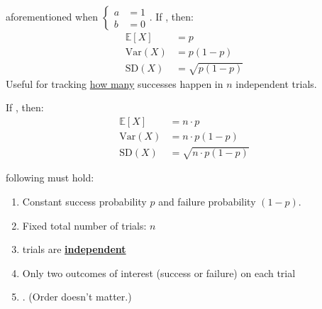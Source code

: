 \documentclass[10pt,landscape]{article}
\newcommand{\Red}[1]{\noindent{\textbf{\textcolor{BrickRed}{#1 -}}}}
\newcommand{\Hint}[1]{\noindent{\textcolor{Orange}{#1}}}
\begin{document}
\begin{multicols}{4}
\Red{Bernoulli Random Variable} aforementioned when $\begin{cases}
    a &= 1 \\
    b &= 0
\end{cases}$.
If , then:
\begin{displaymath}
    \boxed{
        \begin{aligned}
            \mathbb{E}\left[X\right] &= p \\
            \text{Var}(X) &= p(1-p) \\
            \text{SD}(X) &= \sqrt{p (1-p)}
        \end{aligned}
    }
\end{displaymath}
\Hint{
    \begin{itemize}
        \item Variance maximized when $p = 0.5$
        \item Variance minimized when $p = 0$ or $1$
    \end{itemize}
}
Useful for tracking \underline{how many} successes happen in $n$ independent trials.

\Red{Binomial Random Variable}
If , then:
\begin{displaymath}
    \boxed{
        \begin{aligned}
            \mathbb{E}\left[X\right] &= n \cdot p \\
            \text{Var}(X) &= n \cdot p(1-p) \\
            \text{SD}(X) &= \sqrt{n \cdot p(1-p)}
        \end{aligned}
    }
\end{displaymath}

\Red{Binomial Problems} following must hold:
\begin{enumerate}
    \item Constant success probability $p$ and failure probability $(1-p)$.
    \item Fixed total number of trials: $n$
    \item trials are \underline{\textbf{independent}}
    \item Only two outcomes of interest (success or failure) on each trial
    \item \Hint{Want to find the probability of observing $k$ successes among the total number of $n$ trials}. (Order doesn't matter.)
\end{enumerate}


\end{multicols}
\end{document}
